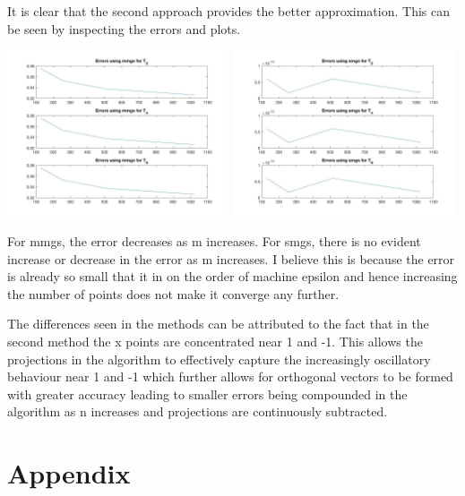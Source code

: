 \documentclass[a4paper,10pt]{article}
\begin{document}
It is clear that the second approach provides the better approximation. This can be seen by inspecting the errors and plots. 

\begin{center}
	\includegraphics[width=0.49\textwidth]{fig_e_mmgs.jpg}
	\includegraphics[width=0.49\textwidth]{fig_e_smgs.jpg}
\end{center}

For mmgs, the error decreases as m increases. For smgs, there is no evident increase or decrease in the error as m increases. I believe this is because the error is already so small that it in on the order of machine epsilon and hence increasing the number of points does not make it converge any further.

The differences seen in the methods can be attributed to the fact that in the second method the x points are concentrated near 1 and -1. This allows the projections in the algorithm to effectively capture the increasingly oscillatory behaviour near 1 and -1 which further allows for orthogonal vectors to be formed with greater accuracy leading to smaller errors being compounded in the algorithm as n increases and projections are continuously subtracted.  

\newpage
\section{Appendix}
\end{document}
